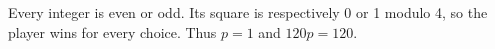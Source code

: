 Every integer is even or odd. Its square is respectively 0 or 1 modulo 4, so the player wins for every choice. Thus $p=1$ and $\boxed{120p=120}$.
